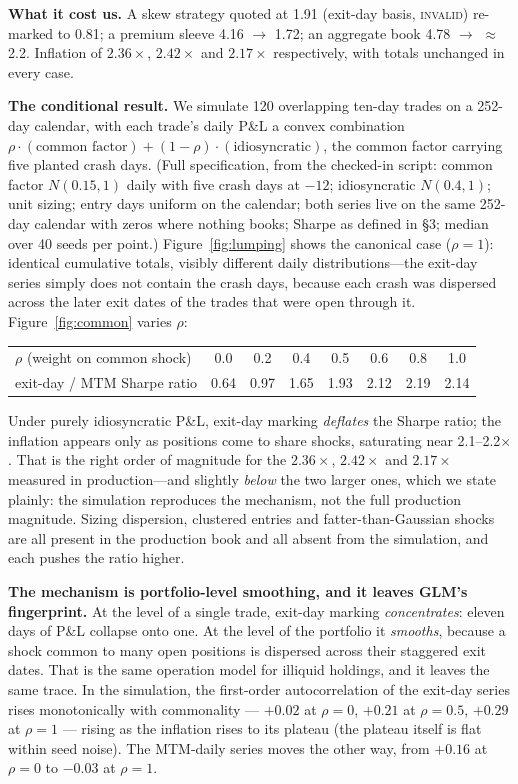 \documentclass[11pt]{article}
\begin{document}
\textbf{What it cost us.} A skew strategy quoted at 1.91 (exit-day basis, \textsc{invalid})
re-marked to 0.81; a premium sleeve 4.16 $\to$ 1.72; an aggregate book 4.78 $\to$
$\approx$2.2. Inflation of $2.36\times$, $2.42\times$ and $2.17\times$ respectively, with
totals unchanged in every case.

\textbf{The conditional result.} We simulate 120 overlapping ten-day trades on a 252-day
calendar, with each trade's daily P\&L a convex combination
$\rho \cdot (\text{common factor}) + (1-\rho) \cdot (\text{idiosyncratic})$, the common factor
carrying five planted crash days. (Full specification, from the checked-in script: common
factor $N(0.15, 1)$ daily with five crash days at $-12$; idiosyncratic $N(0.4, 1)$; unit
sizing; entry days uniform on the calendar; both series live on the same 252-day calendar with
zeros where nothing books; Sharpe as defined in \S3; median over 40 seeds per point.) Figure~\ref{fig:lumping} shows the canonical case
($\rho = 1$): identical cumulative totals, visibly different daily distributions---the exit-day
series simply does not contain the crash days, because each crash was dispersed across the
later exit dates of the trades that were open through it.
Figure~\ref{fig:common} varies $\rho$:
\begin{center}\small
\begin{tabular}{lccccccc}\toprule
$\rho$ (weight on common shock) & 0.0 & 0.2 & 0.4 & 0.5 & 0.6 & 0.8 & 1.0 \\
exit-day / MTM Sharpe ratio & 0.64 & 0.97 & 1.65 & 1.93 & 2.12 & 2.19 & 2.14 \\
\bottomrule\end{tabular}\end{center}
Under purely idiosyncratic P\&L, exit-day marking \emph{deflates} the Sharpe ratio; the
inflation appears only as positions come to share shocks, saturating near 2.1--2.2$\times$.
That is the right order of magnitude for the $2.36\times$, $2.42\times$ and $2.17\times$
measured in production---and slightly \emph{below} the two larger ones, which we state plainly:
the simulation reproduces the mechanism, not the full production magnitude. Sizing dispersion,
clustered entries and fatter-than-Gaussian shocks are all present in the production book and
all absent from the simulation, and each pushes the ratio higher.

\textbf{The mechanism is portfolio-level smoothing, and it leaves GLM's fingerprint.} At the
level of a single trade, exit-day marking \emph{concentrates}: eleven days of P\&L collapse onto
one. At the level of the portfolio it \emph{smooths}, because a shock common to many open
positions is dispersed across their staggered exit dates. That is the same operation
\citet{glm} model for illiquid holdings, and it leaves the same trace. In the simulation, the
first-order autocorrelation of the exit-day series rises monotonically with commonality ---
$+0.02$ at $\rho=0$, $+0.21$ at $\rho=0.5$, $+0.29$ at $\rho=1$ --- rising as the inflation
rises to its plateau (the plateau itself is flat within seed noise). The MTM-daily series
moves the other way, from $+0.16$ at $\rho=0$ to $-0.03$
at $\rho=1$.
\end{document}
